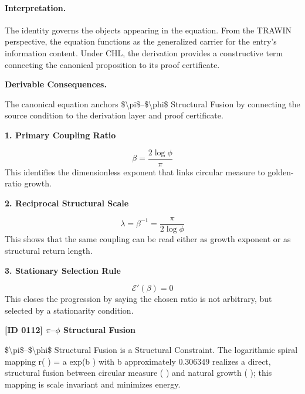 \paragraph{Interpretation.}
The identity governs the objects appearing in the equation. From the TRAWIN perspective, the equation functions as the generalized carrier for the entry’s information content. Under CHL, the derivation provides a constructive term connecting the canonical proposition to its proof certificate.

\par\vspace{0.35em}
\noindent\textbf{Derivable Consequences.}\quad
\begingroup
\footnotesize
\raggedright
The canonical equation anchors \$\textbackslash{}pi\$--\$\textbackslash{}phi\$ Structural Fusion by connecting the source condition to the derivation layer and proof certificate.
\par\endgroup

\noindent\textbf{1. Primary Coupling Ratio}\par
\[
\beta = \frac{2\log \phi}{\pi}
\]
\noindent This identifies the dimensionless exponent that links circular measure to golden-ratio growth.\par
\noindent\textbf{2. Reciprocal Structural Scale}\par
\[
\lambda = \beta^{-1} = \frac{\pi}{2\log \phi}
\]
\noindent This shows that the same coupling can be read either as growth exponent or as structural return length.\par
\noindent\textbf{3. Stationary Selection Rule}\par
\[
\mathcal{E}'(\beta)=0
\]
\noindent This closes the progression by saying the chosen ratio is not arbitrary, but selected by a stationarity condition.\par

\clearpage
\noindent\textbf{[ID 0112] $\pi$--$\phi$ Structural Fusion}\par
\vspace{0.35em}
\begingroup\small
{}
\$\textbackslash{}pi\$--\$\textbackslash{}phi\$ Structural Fusion is a Structural Constraint. The logarithmic spiral mapping r( ) = a exp(b  ) with b approximately 0.306349  realizes a direct, structural fusion between circular measure ( ) and natural growth ( ); this mapping is scale invariant and minimizes energy.

